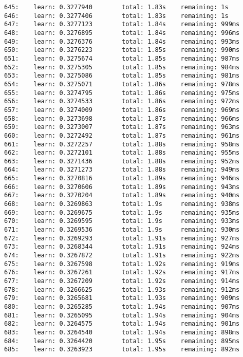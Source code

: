 \documentclass[11pt]{article}
\begin{document}
\begin{Verbatim}[commandchars=\\\{\}]
645:    learn: 0.3277940        total: 1.83s    remaining: 1s
646:    learn: 0.3277406        total: 1.83s    remaining: 1s
647:    learn: 0.3277123        total: 1.84s    remaining: 999ms
648:    learn: 0.3276895        total: 1.84s    remaining: 996ms
649:    learn: 0.3276376        total: 1.84s    remaining: 993ms
650:    learn: 0.3276223        total: 1.85s    remaining: 990ms
651:    learn: 0.3275674        total: 1.85s    remaining: 987ms
652:    learn: 0.3275305        total: 1.85s    remaining: 984ms
653:    learn: 0.3275086        total: 1.85s    remaining: 981ms
654:    learn: 0.3275071        total: 1.86s    remaining: 978ms
655:    learn: 0.3274795        total: 1.86s    remaining: 975ms
656:    learn: 0.3274533        total: 1.86s    remaining: 972ms
657:    learn: 0.3274009        total: 1.86s    remaining: 969ms
658:    learn: 0.3273698        total: 1.87s    remaining: 966ms
659:    learn: 0.3273007        total: 1.87s    remaining: 963ms
660:    learn: 0.3272492        total: 1.87s    remaining: 961ms
661:    learn: 0.3272257        total: 1.88s    remaining: 958ms
662:    learn: 0.3272101        total: 1.88s    remaining: 955ms
663:    learn: 0.3271436        total: 1.88s    remaining: 952ms
664:    learn: 0.3271273        total: 1.88s    remaining: 949ms
665:    learn: 0.3270816        total: 1.89s    remaining: 946ms
666:    learn: 0.3270606        total: 1.89s    remaining: 943ms
667:    learn: 0.3270204        total: 1.89s    remaining: 940ms
668:    learn: 0.3269863        total: 1.9s     remaining: 938ms
669:    learn: 0.3269675        total: 1.9s     remaining: 935ms
670:    learn: 0.3269595        total: 1.9s     remaining: 933ms
671:    learn: 0.3269536        total: 1.9s     remaining: 930ms
672:    learn: 0.3269293        total: 1.91s    remaining: 927ms
673:    learn: 0.3268344        total: 1.91s    remaining: 924ms
674:    learn: 0.3267872        total: 1.91s    remaining: 922ms
675:    learn: 0.3267598        total: 1.92s    remaining: 919ms
676:    learn: 0.3267261        total: 1.92s    remaining: 917ms
677:    learn: 0.3267209        total: 1.92s    remaining: 914ms
678:    learn: 0.3266625        total: 1.93s    remaining: 912ms
679:    learn: 0.3265681        total: 1.93s    remaining: 909ms
680:    learn: 0.3265285        total: 1.94s    remaining: 907ms
681:    learn: 0.3265095        total: 1.94s    remaining: 904ms
682:    learn: 0.3264575        total: 1.94s    remaining: 901ms
683:    learn: 0.3264540        total: 1.94s    remaining: 898ms
684:    learn: 0.3264420        total: 1.95s    remaining: 895ms
685:    learn: 0.3263923        total: 1.95s    remaining: 892ms

\end{Verbatim}
\end{document}
